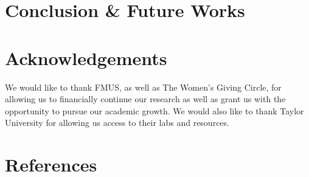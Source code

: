 \documentclass{article}
\begin{document}
%
%
\section{Conclusion \& Future Works}
\justify

%
%
\section{Acknowledgements}
\justify

We would like to thank FMUS, as well as The Women’s Giving Circle, for allowing us to financially continue our research as well as grant us with the opportunity to pursue our  academic growth. We would also like to thank Taylor University for allowing us access to their labs and resources. \par

%
%
\section{References}
\justify
\end{document}
